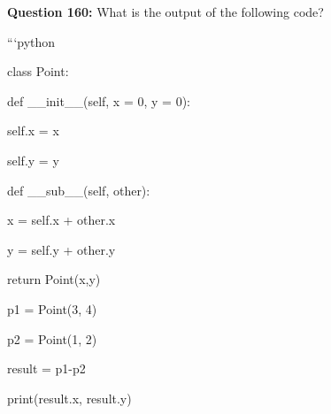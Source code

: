 \documentclass[12pt,a4paper]{article}
\begin{document}
\vspace{0.5cm}

\textbf{Question 160:} What is the output of the following code?\newline

\newline
\newline

\newline
```python\newline

\newline
class Point:\newline

\newline
    def __init__(self, x = 0, y = 0):\newline

\newline
        self.x = x\newline

\newline
        self.y = y\newline

\newline
\newline

\newline
    def __sub__(self, other):\newline

\newline
        x = self.x + other.x\newline

\newline
        y = self.y + other.y\newline

\newline
        return Point(x,y)\newline

\newline
\newline

\newline
p1 = Point(3, 4)\newline

\newline
p2 = Point(1, 2)\newline

\newline
result = p1-p2\newline

\newline
print(result.x, result.y)\newline
\end{document}
